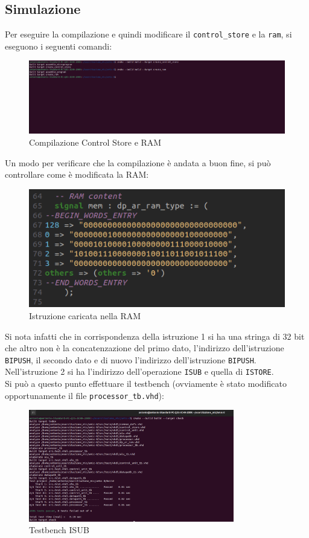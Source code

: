 
\subsection{Simulazione}
Per eseguire la compilazione e quindi modificare il \texttt{control\_store} e la \texttt{ram}, si eseguono i seguenti comandi:
\begin{figure}[H]
	\centering
	\includegraphics[width=1\textwidth]{img/Esercizio_9/Compile}
	\caption{Compilazione Control Store e RAM}
	\label{compile}
\end{figure}
Un modo per verificare che la compilazione è andata a buon fine, si può controllare come è modificata la RAM:
\begin{figure}[H]
	\centering
	\includegraphics[width=1\textwidth]{img/Esercizio_9/ram_sub}
	\caption{Istruzione caricata nella RAM}
	\label{tam_sub}
\end{figure}
Si nota infatti che in corrispondenza della istruzione 1 si ha una stringa di 32 bit che altro non è la concatenzazione del primo dato, l'indirizzo dell'istruzione \texttt{BIPUSH}, il secondo dato e di nuovo l'indirizzo dell'istruzione \texttt{BIPUSH}. 
Nell'istruzione 2 si ha l'indirizzo dell'operazione \texttt{ISUB} e quella di \texttt{ISTORE}.\\
Si può a questo punto effettuare il testbench (ovviamente è stato modificato opportunamente il file \texttt{processor\_tb.vhd}):
\begin{figure}[H]
	\centering
	\includegraphics[width=0.8\textwidth]{img/Esercizio_9/tb_sub}
	\caption{Testbench ISUB}
	\label{tb_sub}
\end{figure}
